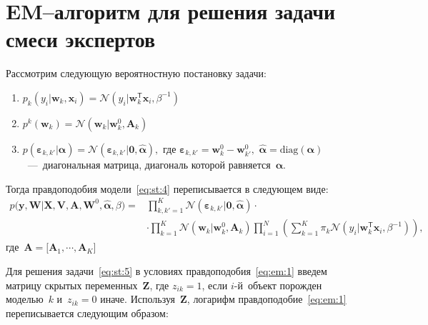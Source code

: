 \documentclass[12pt, twoside]{article}
\numberwithin{equation}{section}
\begin{document}
\section{EM--алгоритм для решения задачи смеси экспертов}
Рассмотрим следующую вероятностную постановку задачи:
\begin{enumerate}
	\item $p_{k}\left(y_{i}|\mathbf{w}_{k}, \mathbf{x}_{i}\right) = \mathcal{N}\left(y_{i}|\mathbf{w}_{k}^{\mathsf{T}}\mathbf{x}_{i}, \beta^{-1}\right)$
	\item $p^{k}\left(\mathbf{w}_{k}\right) = \mathcal{N}\left(\mathbf{w}_{k}|\mathbf{w}^{0}_{k}, \mathbf{A}_{k}\right)$
	\item $p\left(\bm{\varepsilon}_{k,k'}|\bm{\alpha}\right) = \mathcal{N}\left(\bm{\varepsilon}_{k,k'}|\mathbf{0},  \hat{\bm{\alpha}}\right),$ где $\bm{\varepsilon}_{k,k'} = \mathbf{w}_{k}^{0}-\mathbf{w}_{k'}^{0},$ $\hat{\bm{\alpha}} = \text{diag}\left(\bm{\alpha}\right)$~---~диагональная матрица, диагональ которой равняется~$\bm{\alpha}$.
\end{enumerate}
Тогда правдоподобия модели~\eqref{eq:st:4} переписывается в следующем виде:
\begin{equation}
\label{eq:em:1}
\begin{aligned}
p\bigr(\mathbf{y}, \mathbf{W}|\mathbf{X}, \mathbf{V}, \textbf{A}, \textbf{W}^{0}, \hat{\bm{\alpha}}, \beta\bigr) = &\prod_{k,k'=1}^{K}\mathcal{N}\left(\bm{\varepsilon}_{k,k'}|\mathbf{0},  \hat{\bm{\alpha}}\right)\cdot\\
&\cdot\prod_{k=1}^{K}\mathcal{N}\left(\mathbf{w}_{k}|\mathbf{w}^{0}_{k}, \mathbf{A}_{k}\right)\prod_{i=1}^{N}\left(\sum_{k=1}^{K}\pi_{k}\mathcal{N}\left(y_{i}|\mathbf{w}_{k}^{\mathsf{T}}\mathbf{x}_{i}, \beta^{-1}\right)\right),
\end{aligned}
\end{equation}
где~$\mathbf{A} = \bigr[\mathbf{A}_1, \cdots, \mathbf{A}_K\bigr]$

Для решения задачи~\eqref{eq:st:5} в условиях правдоподобия~\eqref{eq:em:1} введем матрицу скрытых переменных~$\mathbf{Z}$, где $z_{ik} = 1$, если $i$-й~объект порожден моделью~$k$ и~$z_{ik} = 0$ иначе. Используя~$\mathbf{Z}$, логарифм правдоподобие~\eqref{eq:em:1} переписывается следующим образом:
\end{document}
